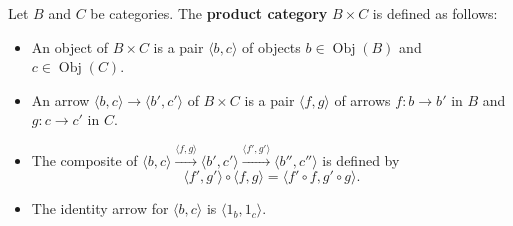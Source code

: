 Let $B$ and $C$ be categories. The \textbf{product category} $B \times C$ is defined as follows:
\begin{itemize}
\item An object of $B \times C$ is a pair $\langle b, c \rangle$ of objects $b \in \operatorname{Obj}(B)$ and $c \in \operatorname{Obj}(C)$.
\item An arrow $\langle b, c \rangle \to \langle b', c' \rangle$ of $B \times C$ is a pair $\langle f, g \rangle$ of arrows $f: b \to b'$ in $B$ and $g: c \to c'$ in $C$.
\item The composite of $\langle b, c \rangle \xrightarrow{\langle f, g \rangle} \langle b', c' \rangle \xrightarrow{\langle f', g' \rangle} \langle b'', c'' \rangle$ is defined by
  $$\langle f', g' \rangle \circ \langle f, g \rangle = \langle f' \circ f, g' \circ g \rangle.$$
\item The identity arrow for $\langle b, c \rangle$ is $\langle 1_b, 1_c \rangle$.
\end{itemize}
